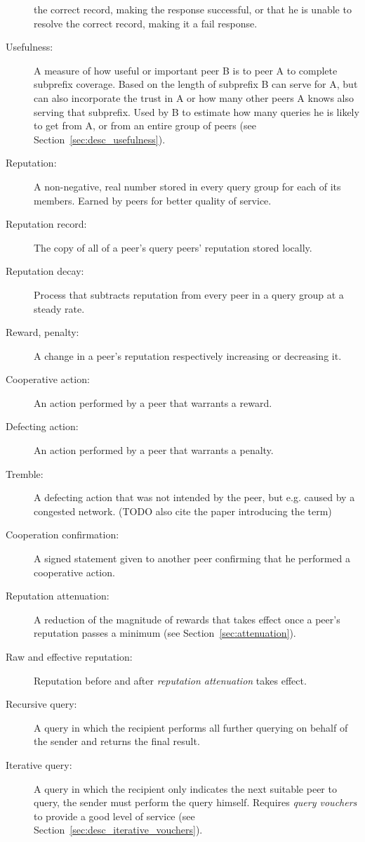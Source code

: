 \begin{description}
the correct record, making the response successful, or that he is unable to
resolve the correct record, making it a fail response.
\item[Usefulness:] A measure of how useful or important peer B is to peer A to
complete subprefix coverage. Based on the length of subprefix B can serve for A,
but can also incorporate the trust in A or how many other peers A knows also
serving that subprefix. Used by B to estimate how many queries he is likely to
get from A, or from an entire group of peers (see
Section~\ref{sec:desc_usefulness}).
\item[Reputation:] A non-negative, real number stored in every query group for
each of its members. Earned by peers for better quality of service.
\item[Reputation record:] The copy of all of a peer's query peers' reputation
stored locally.
\item[Reputation decay:] Process that subtracts reputation from every peer in a
query group at a steady rate.
\item[Reward, penalty:] A change in a peer's reputation respectively increasing
or decreasing it.
\item[Cooperative action:] An action performed by a peer that warrants a reward.
\item[Defecting action:] An action performed by a peer that warrants a penalty.
\item[Tremble:] A defecting action that was not intended by the peer, but e.g.
caused by a congested network. (TODO also cite the paper introducing the term)
\item[Cooperation confirmation:] A signed statement given to another peer
confirming that he performed a cooperative action.
\item[Reputation attenuation:] A reduction of the magnitude of rewards that
takes effect once a peer's reputation passes a minimum (see
Section~\ref{sec:attenuation}).
\item[Raw and effective reputation:] Reputation before and after
\emph{reputation attenuation} takes effect.
\item[Recursive query:] A query in which the recipient performs all further
querying on behalf of the sender and returns the final result.
\item[Iterative query:] A query in which the recipient only indicates the next
suitable peer to query, the sender must perform the query himself. Requires
\emph{query vouchers} to provide a good level of service (see
Section~\ref{sec:desc_iterative_vouchers}).

\end{description}
